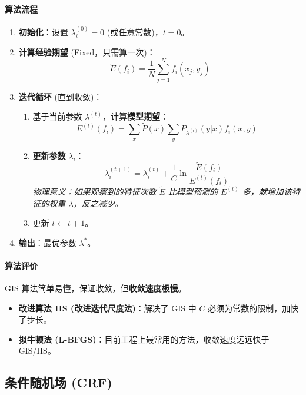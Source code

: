 \documentclass[a4paper, 11pt]{ctexart}
\begin{document}
\paragraph{算法流程}
\begin{enumerate}
    \item \textbf{初始化}：设置 $\lambda_i^{(0)} = 0$ (或任意常数)，$t=0$。
    \item \textbf{计算经验期望} (Fixed，只需算一次)：
    $$ \tilde{E}(f_i) = \frac{1}{N} \sum_{j=1}^N f_i(x_j, y_j) $$
    \item \textbf{迭代循环} (直到收敛)：
    \begin{enumerate}
        \item 基于当前参数 $\lambda^{(t)}$，计算\textbf{模型期望}：
        $$ E^{(t)}(f_i) = \sum_{x} \tilde{P}(x) \sum_{y} P_{\lambda^{(t)}}(y|x) f_i(x,y) $$
        \item \textbf{更新参数} $\lambda_i$：
        \begin{equation}
            \lambda_i^{(t+1)} = \lambda_i^{(t)} + \frac{1}{C} \ln \frac{\tilde{E}(f_i)}{E^{(t)}(f_i)}
        \end{equation}
        \textit{物理意义：如果观察到的特征次数 $\tilde{E}$ 比模型预测的 $E^{(t)}$ 多，就增加该特征的权重 $\lambda$，反之减少。}
        \item 更新 $t \leftarrow t+1$。
    \end{enumerate}
    \item \textbf{输出}：最优参数 $\lambda^*$。
\end{enumerate}

\paragraph{算法评价}
GIS 算法简单易懂，保证收敛，但\textbf{收敛速度极慢}。
\begin{itemize}
    \item \textbf{改进算法 IIS (改进迭代尺度法)}：解决了 GIS 中 $C$ 必须为常数的限制，加快了步长。
    \item \textbf{拟牛顿法 (L-BFGS)}：目前工程上最常用的方法，收敛速度远远快于 GIS/IIS。
\end{itemize}

\subsection{条件随机场 (CRF)}
\end{document}
